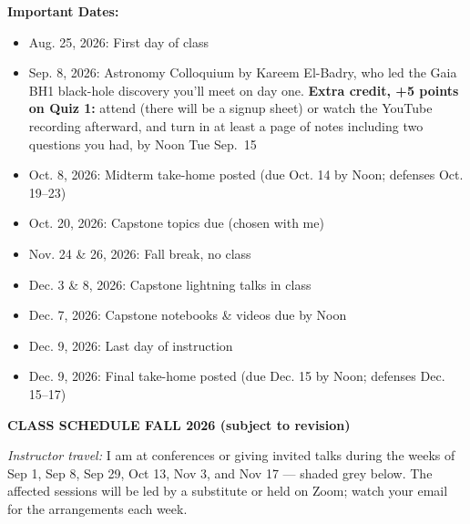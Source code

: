 {\bf \headerfont \color{RoyalBlue} Important Dates:}

\begin{itemize}
    \setlength\itemsep{0.05em}
    \footnotesize
    \item Aug. 25, 2026: First day of class\\
    \item Sep. \phantom{0}8, 2026: Astronomy Colloquium by Kareem El-Badry, who led the Gaia BH1 black-hole discovery you'll meet on day one. {\bf Extra credit, +5 points on Quiz 1:} attend (there will be a signup sheet) or watch the YouTube recording afterward, and turn in at least a page of notes including two questions you had, by Noon Tue Sep.~15\\
    \item Oct. \phantom{0}8, 2026: Midterm take-home posted (due Oct. 14 by Noon; defenses Oct. 19--23)\\
    \item Oct. 20, 2026: Capstone topics due (chosen with me)\\
    \item Nov. 24 \& 26, 2026: Fall break, no class\\
    \item Dec. \phantom{0}3 \& 8, 2026: Capstone lightning talks in class\\
    \item Dec. \phantom{0}7, 2026: Capstone notebooks \& videos due by Noon\\
    \item Dec. \phantom{0}9, 2026: Last day of instruction\\
    \item Dec. \phantom{0}9, 2026: Final take-home posted (due Dec. 15 by Noon; defenses Dec. 15--17)\\
\end{itemize}

{\large \bf \headerfont \color{RoyalBlue} CLASS SCHEDULE FALL 2026 (subject to revision)}

{\footnotesize \emph{Instructor travel:} I am at conferences or giving invited
talks during the weeks of Sep 1, Sep 8, Sep 29, Oct 13, Nov 3, and Nov 17 ---
shaded grey below. The affected sessions will be led by a substitute or held
on Zoom; watch your email for the arrangements each week.}

\newcommand{\travelrow}[1]{\colorbox{gray!25}{\parbox[t]{\dimexpr\linewidth-2\fboxsep\relax}{\makebox[0pt][r]{\textbullet\kern 0.85em}#1}}}

